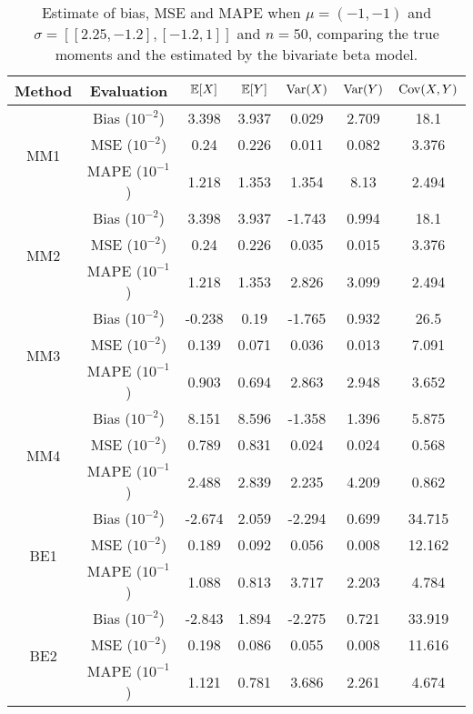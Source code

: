 \begin{table}[htbp]
\centering
\begin{tabular}{c|c|ccccc}
Method & Evaluation & $\mathbb{E}[X]$ & $\mathbb{E}[Y]$ & $\operatorname{Var}(X)$ & $\operatorname{Var}(Y)$ & $\operatorname{Cov}(X,Y)$ \\
\hline \multirow{3}{*}{MM1}& Bias ($10^{-2}$)  & 3.398 & 3.937 & 0.029 & 2.709 & 18.1 \\ 
& MSE ($10^{-2}$)  & 0.24 & 0.226 & 0.011 & 0.082 & 3.376 \\ 
& MAPE ($10^{-1}$)  & 1.218 & 1.353 & 1.354 & 8.13 & 2.494 \\ 
\hline \multirow{3}{*}{MM2}& Bias ($10^{-2}$)  & 3.398 & 3.937 & -1.743 & 0.994 & 18.1 \\ 
& MSE ($10^{-2}$)  & 0.24 & 0.226 & 0.035 & 0.015 & 3.376 \\ 
& MAPE ($10^{-1}$)  & 1.218 & 1.353 & 2.826 & 3.099 & 2.494 \\ 
\hline \multirow{3}{*}{MM3}& Bias ($10^{-2}$)  & -0.238 & 0.19 & -1.765 & 0.932 & 26.5 \\ 
& MSE ($10^{-2}$)  & 0.139 & 0.071 & 0.036 & 0.013 & 7.091 \\ 
& MAPE ($10^{-1}$)  & 0.903 & 0.694 & 2.863 & 2.948 & 3.652 \\ 
\hline \multirow{3}{*}{MM4}& Bias ($10^{-2}$)  & 8.151 & 8.596 & -1.358 & 1.396 & 5.875 \\ 
& MSE ($10^{-2}$)  & 0.789 & 0.831 & 0.024 & 0.024 & 0.568 \\ 
& MAPE ($10^{-1}$)  & 2.488 & 2.839 & 2.235 & 4.209 & 0.862 \\ 
\hline \multirow{3}{*}{BE1}& Bias ($10^{-2}$)  & -2.674 & 2.059 & -2.294 & 0.699 & 34.715 \\ 
& MSE ($10^{-2}$)  & 0.189 & 0.092 & 0.056 & 0.008 & 12.162 \\ 
& MAPE ($10^{-1}$)  & 1.088 & 0.813 & 3.717 & 2.203 & 4.784 \\ 
\hline \multirow{3}{*}{BE2}& Bias ($10^{-2}$)  & -2.843 & 1.894 & -2.275 & 0.721 & 33.919 \\ 
& MSE ($10^{-2}$)  & 0.198 & 0.086 & 0.055 & 0.008 & 11.616 \\ 
& MAPE ($10^{-1}$)  & 1.121 & 0.781 & 3.686 & 2.261 & 4.674 \\ 
\end{tabular}
\caption{\label{tab:alpha-experiment5}Estimate of bias, MSE and MAPE when $\mu = (-1,-1)$ and $\sigma = [[2.25,-1.2], [-1.2,1]]$ and $n=50$, comparing the true moments and the estimated by the bivariate beta model.}
\end{table}